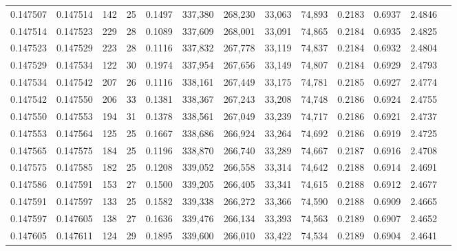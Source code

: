\begin{tabular}{rrrrrrrrrrrrr}
0.147507 & 0.147514 & 142 &  25 &                                     0.1497 & 337,380 & 268,230 &  33,063 &  74,893 & 0.2183 & 0.6937 & 2.4846 \\
0.147514 & 0.147523 & 229 &  28 &                                     0.1089 & 337,609 & 268,001 &  33,091 &  74,865 & 0.2184 & 0.6935 & 2.4825 \\
0.147523 & 0.147529 & 223 &  28 &                                     0.1116 & 337,832 & 267,778 &  33,119 &  74,837 & 0.2184 & 0.6932 & 2.4804 \\
0.147529 & 0.147534 & 122 &  30 &                                     0.1974 & 337,954 & 267,656 &  33,149 &  74,807 & 0.2184 & 0.6929 & 2.4793 \\
0.147534 & 0.147542 & 207 &  26 &                                     0.1116 & 338,161 & 267,449 &  33,175 &  74,781 & 0.2185 & 0.6927 & 2.4774 \\
0.147542 & 0.147550 & 206 &  33 &                                     0.1381 & 338,367 & 267,243 &  33,208 &  74,748 & 0.2186 & 0.6924 & 2.4755 \\
0.147550 & 0.147553 & 194 &  31 &                                     0.1378 & 338,561 & 267,049 &  33,239 &  74,717 & 0.2186 & 0.6921 & 2.4737 \\
0.147553 & 0.147564 & 125 &  25 &                                     0.1667 & 338,686 & 266,924 &  33,264 &  74,692 & 0.2186 & 0.6919 & 2.4725 \\
0.147565 & 0.147575 & 184 &  25 &                                     0.1196 & 338,870 & 266,740 &  33,289 &  74,667 & 0.2187 & 0.6916 & 2.4708 \\
0.147575 & 0.147585 & 182 &  25 &                                     0.1208 & 339,052 & 266,558 &  33,314 &  74,642 & 0.2188 & 0.6914 & 2.4691 \\
0.147586 & 0.147591 & 153 &  27 &                                     0.1500 & 339,205 & 266,405 &  33,341 &  74,615 & 0.2188 & 0.6912 & 2.4677 \\
0.147591 & 0.147597 & 133 &  25 &                                     0.1582 & 339,338 & 266,272 &  33,366 &  74,590 & 0.2188 & 0.6909 & 2.4665 \\
0.147597 & 0.147605 & 138 &  27 &                                     0.1636 & 339,476 & 266,134 &  33,393 &  74,563 & 0.2189 & 0.6907 & 2.4652 \\
0.147605 & 0.147611 & 124 &  29 &                                     0.1895 & 339,600 & 266,010 &  33,422 &  74,534 & 0.2189 & 0.6904 & 2.4641 \\

\end{tabular}
